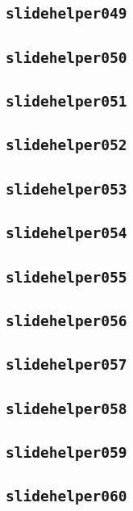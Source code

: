 \subsection{\texttt{slidehelper049}}
\newpage
\subsection{\texttt{slidehelper050}}
\newpage
\subsection{\texttt{slidehelper051}}
\newpage
\subsection{\texttt{slidehelper052}}
\newpage
\subsection{\texttt{slidehelper053}}
\newpage
\subsection{\texttt{slidehelper054}}
\newpage
\subsection{\texttt{slidehelper055}}
\newpage
\subsection{\texttt{slidehelper056}}
\newpage
\subsection{\texttt{slidehelper057}}
\newpage
\subsection{\texttt{slidehelper058}}
\newpage
\subsection{\texttt{slidehelper059}}
\newpage
\subsection{\texttt{slidehelper060}}
\newpage
